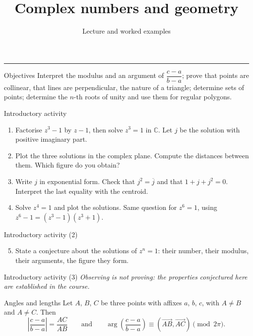 \documentclass[aspectratio=169,10pt]{beamer}
\title{Complex numbers and geometry}
\subtitle{Lecture and worked examples}
\date{}
\author{}
\providecommand{\C}{\mathbb{C}}
\providecommand{\vect}[1]{\overrightarrow{#1}}
\providecommand{\abs}[1]{\left\lvert #1\right\rvert}
\begin{document}
\begin{frame}[plain]
\vfill
{\inserttitle\par}
\medskip
{\insertsubtitle\par}
\medskip
{\rule{\textwidth}{.5pt}}
\vfill
\end{frame}
\begin{frame}{Objectives}
Interpret the modulus and an argument of \(\dfrac{c-a}{b-a}\); prove that points are collinear, that lines are perpendicular, the nature of a triangle; determine sets of points; determine the \(n\)-th roots of unity and use them for regular polygons.
\end{frame}
\begin{frame}{Introductory activity}
\begin{enumerate}
\setcounter{enumi}{0}\item Factorise \(z^3-1\) by \(z-1\), then solve \(z^3=1\) in \(\C\). Let \(j\) be the solution with positive imaginary part.

\item Plot the three solutions in the complex plane. Compute the distances between them. Which figure do you obtain?

\item Write \(j\) in exponential form. Check that \(j^2=\overline j\) and that \(1+j+j^2=0\). Interpret the last equality with the centroid.

\item Solve \(z^4=1\) and plot the solutions. Same question for \(z^6=1\), using \(z^6-1=\left(z^3-1\right)\left(z^3+1\right)\).

\end{enumerate}
\end{frame}
\begin{frame}{Introductory activity (2)}
\begin{enumerate}
\setcounter{enumi}{4}\item State a conjecture about the solutions of \(z^n=1\): their number, their modulus, their arguments, the figure they form.

\end{enumerate}
\end{frame}
\begin{frame}{Introductory activity (3)}
\emph{Observing is not proving: the properties conjectured here are established in the course.}
\end{frame}
\begin{frame}{Angles and lengths}
Let \(A\), \(B\), \(C\) be three points with affixes \(a\), \(b\), \(c\), with \(A\neq B\) and \(A\neq C\). Then
\[\abs{\dfrac{c-a}{b-a}}=\dfrac{AC}{AB}\qquad\text{and}\qquad\arg\left(\dfrac{c-a}{b-a}\right)\equiv\left(\vect{AB},\vect{AC}\right)\pmod{2\pi}.\]
\end{frame}
\end{document}
